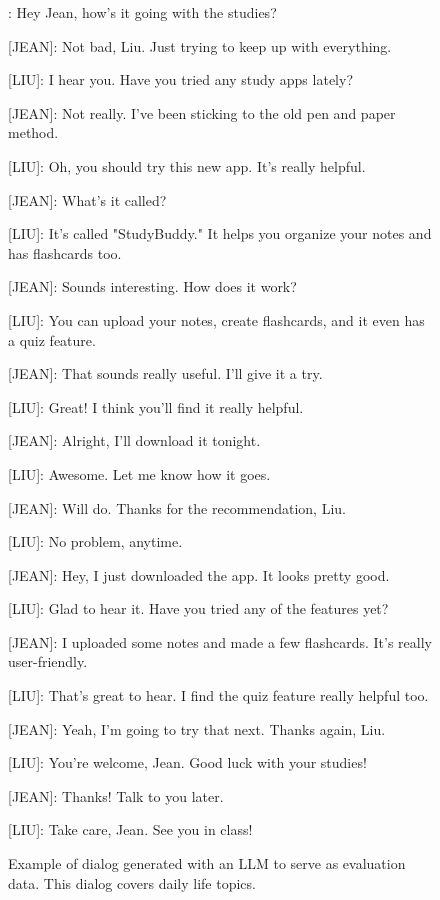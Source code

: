 \begin{figure}
    \centering
    \begin{tcolorbox}[width=\textwidth, colback=white, colframe=black, boxrule=0.8pt, fonttitle=\bfseries, title={Dialog example, daily life}]
[LIU]: Hey Jean, how's it going with the studies?

[JEAN]: Not bad, Liu. Just trying to keep up with everything.

[LIU]: I hear you. Have you tried any study apps lately?

[JEAN]: Not really. I've been sticking to the old pen and paper method.

[LIU]: Oh, you should try this new app. It's really helpful.

[JEAN]: What's it called?

[LIU]: It's called "StudyBuddy." It helps you organize your notes and has flashcards too.

[JEAN]: Sounds interesting. How does it work?

[LIU]: You can upload your notes, create flashcards, and it even has a quiz feature.

[JEAN]: That sounds really useful. I'll give it a try.

[LIU]: Great! I think you'll find it really helpful.

[JEAN]: Alright, I'll download it tonight.

[LIU]: Awesome. Let me know how it goes.

[JEAN]: Will do. Thanks for the recommendation, Liu.

[LIU]: No problem, anytime.

[JEAN]: Hey, I just downloaded the app. It looks pretty good.

[LIU]: Glad to hear it. Have you tried any of the features yet?

[JEAN]: I uploaded some notes and made a few flashcards. It's really user-friendly.

[LIU]: That's great to hear. I find the quiz feature really helpful too.

[JEAN]: Yeah, I'm going to try that next. Thanks again, Liu.

[LIU]: You're welcome, Jean. Good luck with your studies!

[JEAN]: Thanks! Talk to you later.

[LIU]: Take care, Jean. See you in class!
    \end{tcolorbox}
    \caption{Example of dialog generated with an LLM to serve as evaluation
    data. This dialog covers daily life topics.}
    \label{fig:dialog-example-daily}
\end{figure}

